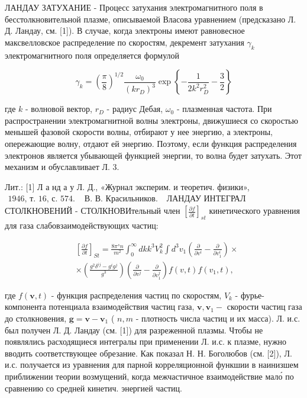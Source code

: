 \documentclass[10pt]{article}
\begin{document}
ЛАНДАУ ЗАТУХАНИЕ - Процесс затухания электромагнитного поля в бесстолкновительной плазме, описываемой Власова уравнением (предсказано Л. Д. Ландау, см. [1]). В случае, когда электроны имеют равновесное максвелловское распределение по скоростям, декремент затухания $\gamma_{k}$ электромагнитного поля определяется формулой



\[

\gamma_{k}=\left(\frac{\pi}{8}\right)^{1 / 2} \frac{\omega_{0}}{\left(k r_{D}\right)^{3}} \exp \left\{-\frac{1}{2 k^{2} r_{D}^{2}}-\frac{3}{2}\right\}

\]



где $k$ - волновой вектор, $r_{D}$ - радиус Дебая, $\omega_{0}$ - плазменная частота. При распространении электромагнитной волны электроны, движушиеся со скоростью менышей фазовой скорости волны, отбирают у нее энергию, а электроны, опережающие волну, отдают ей энергию. Поэтому, если функция распределения электронов является убывающей функцией энергии, то волна будет затухать. Этот механизм и обуславливает Л. 3.



Лит.: [1] Л а нд а у Л. Д., «Журнал эксперим. и теоретич. физики», $\begin{array}{ll}1946 \text {, т. 16, с. } 574 . & \text { В. В. Красильников. }\end{array}$ ЛАНДАУ ИНТЕГРАЛ СТОЛКНОВЕНИЙ - СТОЛКНОВИтельный член $\left[\frac{\partial f}{\partial t}\right]_{s t}$ кинетического уравнения для газа слабовзаимодействующих частиц:



\[

\begin{aligned}

& {\left[\frac{\partial f}{\partial t}\right]_{S t}=\frac{8 \pi^{s} n}{m^{2}} \int_{0}^{\infty} d k k^{3} V_{k}^{2} \int d^{3} v_{1}\left(\frac{\partial}{\partial v^{i}}-\frac{\partial}{\partial v_{1}^{i}}\right) \times} \\

& \times\left(\frac{g^{2} \delta^{i j}-g^{i} g^{j}}{g^{3}}\right)\left(\frac{\partial}{\partial v^{j}}-\frac{\partial}{\partial v_{1}^{j}}\right) f(v, t) f\left(v_{1}, t\right),

\end{aligned}

\]



где $f(\boldsymbol{v}, t)$ - функция распределения частиц по скоростям, $V_{k}$ - фурье-компонента потенциала взаимодействия частиц газа, $\boldsymbol{v}, \boldsymbol{v}_{1}-$ скорости частиц газа до столкновения, $\boldsymbol{g}=\boldsymbol{v}-\boldsymbol{v}_{1}$ ( $n, m$ - плотность числа частиц и их масса). Л. и.с. был получен Л. Д. Ландау (см. [1]) для разреженной плазмы. Чтобы не появлялись расходящиеся интегралы при применении Л. и.с. к плазме, нужно вводить соответствующее обрезание. Как показал Н. Н. Боголюбов (см. [2]), Л. и.с. получается из уравнения для парной корреляционной функшии в наинизшем приближении теории возмущений, когда межчастичное взаимодействие мало́ по сравнению со средней кинетич. энергией частиц.
\end{document}
